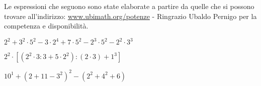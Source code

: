 Le espressioni che seguono sono state elaborate a partire da quelle che si 
possono trovare all'indirizzo:
\href{http://www.ubimath.org/potenze}{www.ubimath.org/potenze} - 
Ringrazio Ubaldo Pernigo per la competenza e disponibilità.

\begin{esercizio} %
\(2^2+3^2\cdot5^2-3\cdot2^4+7\cdot5^2-2^3\cdot5^2-2^2\cdot3^3\) 
\end{esercizio}
\begin{esercizio} %
\(2^2\cdot[(2^2\cdot3:3+5\cdot2^2):(2\cdot3)+1^3]\) 
\end{esercizio}
\begin{esercizio} %
\(10^1+(2+11-3^2)^2-(2^2+4^2+6)\) 
\end{esercizio}
